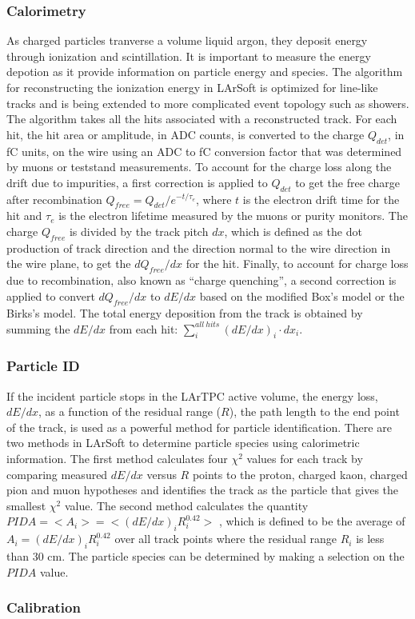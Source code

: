 \subsubsection{Calorimetry}


As charged particles tranverse a volume liquid argon, they deposit
energy through ionization and scintillation. It is important to
measure the energy depotion as it provide information on particle
energy and species. The algorithm for reconstructing the ionization
energy in LArSoft is optimized for line-like tracks and is being
extended to more complicated event topology such as showers. The
algorithm takes all the hits associated with a reconstructed
track. For each hit, the hit area or amplitude, in ADC counts, is
converted to the charge $Q_{det}$, in fC units, on the wire using an
ADC to fC conversion factor that was determined by muons or teststand
measurements. To account for the charge loss along the drift due to
impurities, a first correction is applied to $Q_{det}$ to get the free
charge after recombination $Q_{free} = Q_{det}/e^{-t/\tau_{e}}$, where
$t$ is the electron drift time for the hit and $\tau_{e}$ is the
electron lifetime measured by the muons or purity monitors. The charge
$Q_{free}$ is divided by the track pitch $dx$, which is defined as the
dot production of track direction and the direction normal to the wire
direction in the wire plane, to get the $dQ_{free}/dx$ for the
hit. Finally, to account for charge loss due to recombination, also
known as ``charge quenching'', a second correction is applied to
convert $dQ_{free}/dx$ to $dE/dx$ based on the modified Box's model
\cite{box} or the Birks's model\cite{birks}. The total energy
deposition from the track is obtained by summing the $dE/dx$ from each
hit: $\sum\limits_{i}^{all\ hits}(dE/dx)_{i}\cdot dx_{i}$.


\subsubsection{Particle ID}


If the incident particle stops in the LArTPC active volume, the energy
loss, $dE/dx$, as a function of the residual range ($R$), the path
length to the end point of the track, is used as a powerful method for
particle identification. There are two methods in LArSoft to determine
particle species using calorimetric information. The first method
calculates four $\chi^{2}$ values for each track by comparing measured
$dE/dx$ versus $R$ points to the proton, charged kaon, charged pion
and muon hypotheses and identifies the track as the particle that
gives the smallest $\chi^{2}$ value. The second method calculates the
quantity $PIDA = <A_{i}> = <(dE/dx)_{i}R_{i}^{0.42}>$ \cite{box},
which is defined to be the average of $A_{i} =
(dE/dx)_{i}R_{i}^{0.42}$ over all track points where the residual
range $R_{i}$ is less than 30 cm. The particle species can be
determined by making a selection on the $PIDA$ value.

\subsubsection{Calibration}



